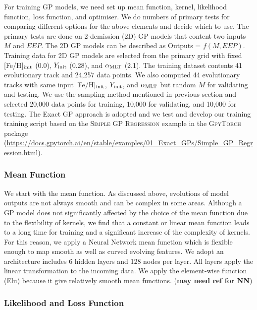 For training GP models, we need set up mean function, kernel, likelihood function, loss function, and optimiser. 
We do numbers of primary tests for comparing different options for the above elements and decide which to use. 
%
The primary tests are done on 2-demission (2D) GP models that content two inputs $M$ and $EEP$. The 2D GP models can be described as Outputs = $f(M, EEP)$. 
%
Training data for 2D GP models are selected from the primary grid with fixed [Fe/H]$_{\rm init}$ (0.0), $Y_{\rm init}$ (0.28), and $\alpha_{\rm MLT}$ (2.1). The training dataset contents 41 evolutionary track and 24,257 data points. We also computed 44 evolutionary tracks with same input [Fe/H]$_{\rm init}$, $Y_{\rm init}$, and $\alpha_{\rm MLT}$ but random $M$ for validating and testing. We use the sampling method mentioned in previous section and selected 20,000 data points for training, 10,000 for validating, and 10,000 for testing. 
%
The Exact GP approach is adopted and we test and develop our training training script based on the \textsc{Simple GP Regression} example in the \textsc{GpyTorch} package (\url{https://docs.gpytorch.ai/en/stable/examples/01_Exact_GPs/Simple_GP_Regression.html}).

\subsubsection{Mean Function}

We start with the mean function. As discussed above, evolutions of model outputs are not always smooth and can be complex in some areas. Although a GP model does not significantly affected by the choice of the mean function due to the flexibility of kernels, we find that a constant or linear mean function leads to a long time for training and a significant increase of the complexity of kernels. For this reason, we apply a Neural Network mean function which is flexible enough to map smooth as well as curved evolving features. We adopt an architecture includes 6 hidden layers and 128 nodes per layer. All layers apply the linear transformation to the incoming data. We apply the element-wise function (Elu) because it give relatively smooth mean functions. ({\bf may need ref for NN})

\subsubsection{Likelihood and Loss Function}

